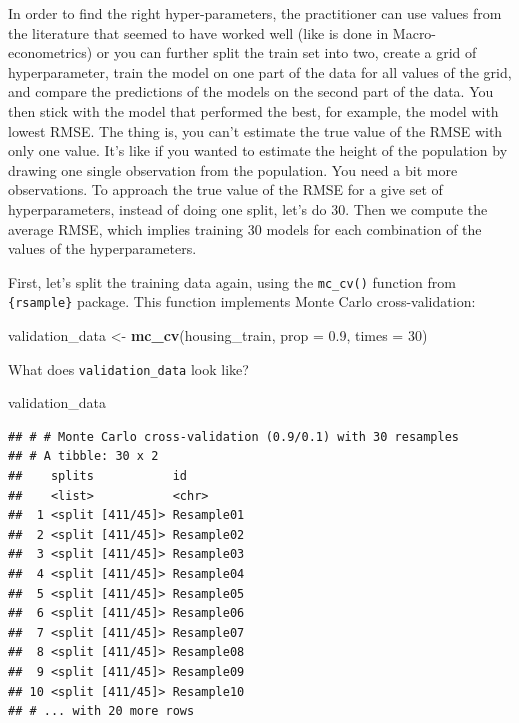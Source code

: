 \documentclass[]{gitbook}
\newenvironment{Shaded}{\begin{snugshade}}{\end{snugshade}}
\newcommand{\DataTypeTok}[1]{\textcolor[rgb]{0.13,0.29,0.53}{#1}}
\newcommand{\DecValTok}[1]{\textcolor[rgb]{0.00,0.00,0.81}{#1}}
\newcommand{\FloatTok}[1]{\textcolor[rgb]{0.00,0.00,0.81}{#1}}
\newcommand{\KeywordTok}[1]{\textcolor[rgb]{0.13,0.29,0.53}{\textbf{#1}}}
\newcommand{\NormalTok}[1]{#1}
\newcommand{\StringTok}[1]{\textcolor[rgb]{0.31,0.60,0.02}{#1}}
\theoremstyle{definition}
\theoremstyle{definition}
\theoremstyle{definition}
\theoremstyle{remark}
\begin{document}
In order to find the right hyper-parameters, the practitioner can use
values from the literature that seemed to have worked well (like is done
in Macro-econometrics) or you can further split the train set into two,
create a grid of hyperparameter, train the model on one part of the data
for all values of the grid, and compare the predictions of the models on
the second part of the data. You then stick with the model that
performed the best, for example, the model with lowest RMSE. The thing
is, you can't estimate the true value of the RMSE with only one value.
It's like if you wanted to estimate the height of the population by
drawing one single observation from the population. You need a bit more
observations. To approach the true value of the RMSE for a give set of
hyperparameters, instead of doing one split, let's do 30. Then we
compute the average RMSE, which implies training 30 models for each
combination of the values of the hyperparameters.

First, let's split the training data again, using the \texttt{mc\_cv()}
function from \texttt{\{rsample\}} package. This function implements
Monte Carlo cross-validation:

\begin{Shaded}
\begin{Highlighting}[]
\NormalTok{validation_data <-}\StringTok{ }\KeywordTok{mc_cv}\NormalTok{(housing_train, }\DataTypeTok{prop =} \FloatTok{0.9}\NormalTok{, }\DataTypeTok{times =} \DecValTok{30}\NormalTok{)}
\end{Highlighting}
\end{Shaded}

What does \texttt{validation\_data} look like?

\begin{Shaded}
\begin{Highlighting}[]
\NormalTok{validation_data}
\end{Highlighting}
\end{Shaded}

\begin{verbatim}
## # # Monte Carlo cross-validation (0.9/0.1) with 30 resamples  
## # A tibble: 30 x 2
##    splits           id        
##    <list>           <chr>     
##  1 <split [411/45]> Resample01
##  2 <split [411/45]> Resample02
##  3 <split [411/45]> Resample03
##  4 <split [411/45]> Resample04
##  5 <split [411/45]> Resample05
##  6 <split [411/45]> Resample06
##  7 <split [411/45]> Resample07
##  8 <split [411/45]> Resample08
##  9 <split [411/45]> Resample09
## 10 <split [411/45]> Resample10
## # ... with 20 more rows
\end{verbatim}
\end{document}

